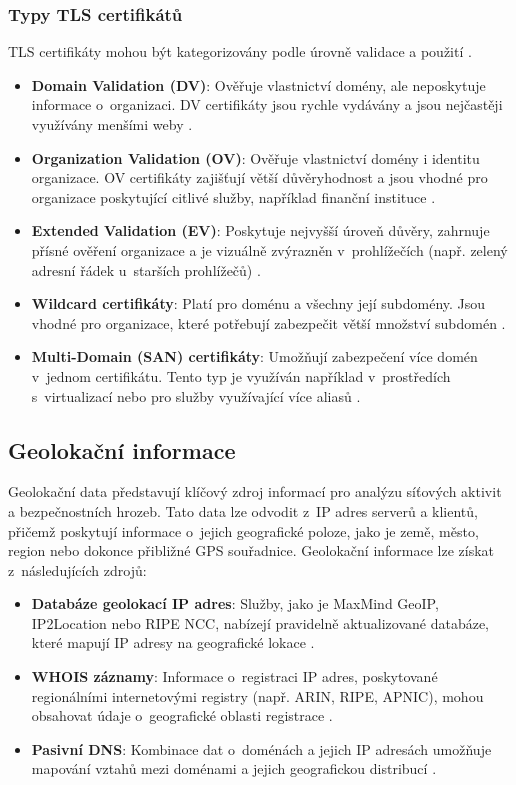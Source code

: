 \subsubsection*{Typy TLS certifikátů}
TLS certifikáty mohou být kategorizovány podle úrovně validace a použití \cite{cabforum_tls, barnes2016multi}.
\begin{itemize}
    \item \textbf{Domain Validation (DV)}: Ověřuje vlastnictví domény, ale neposkytuje informace o~organizaci. DV certifikáty jsou rychle vydávány a jsou nejčastěji využívány menšími weby \cite{barnes2016multi}.
    \item \textbf{Organization Validation (OV)}: Ověřuje vlastnictví domény i identitu organizace. OV certifikáty zajišťují větší důvěryhodnost a jsou vhodné pro organizace poskytující citlivé služby, například finanční instituce \cite{cabforum_tls}.
    \item \textbf{Extended Validation (EV)}: Poskytuje nejvyšší úroveň důvěry, zahrnuje přísné ověření organizace a je vizuálně zvýrazněn v~prohlížečích (např. zelený adresní řádek u~starších prohlížečů) \cite{cabforum_tls}.
    \item \textbf{Wildcard certifikáty}: Platí pro doménu a všechny její subdomény. Jsou vhodné pro organizace, které potřebují zabezpečit větší množství subdomén \cite{barnes2016multi}.
    \item \textbf{Multi-Domain (SAN) certifikáty}: Umožňují zabezpečení více domén v~jednom certifikátu. Tento typ je využíván například v~prostředích s~virtualizací nebo pro služby využívající více aliasů \cite{cabforum_tls}.
\end{itemize}


\subsection{Geolokační informace}
Geolokační data představují klíčový zdroj informací pro analýzu síťových aktivit a bezpečnostních hrozeb. Tato data lze odvodit z~IP adres serverů a klientů, přičemž poskytují informace o~jejich geografické poloze, jako je země, město, region nebo dokonce přibližné GPS souřadnice. Geolokační informace lze získat z~následujících zdrojů:


\begin{itemize}
    \item \textbf{Databáze geolokací IP adres}: Služby, jako je MaxMind GeoIP, IP2Location nebo RIPE NCC, nabízejí pravidelně aktualizované databáze, které mapují IP adresy na geografické lokace \cite{geolocation_maxmind, ip2location_service}.
    \item \textbf{WHOIS záznamy}: Informace o~registraci IP adres, poskytované regionálními internetovými registry (např. ARIN, RIPE, APNIC), mohou obsahovat údaje o~geografické oblasti registrace \cite{arin_whois}.
    \item \textbf{Pasivní DNS}: Kombinace dat o~doménách a jejich IP adresách umožňuje mapování vztahů mezi doménami a jejich geografickou distribucí \cite{silveira2021detection}.
\end{itemize}

